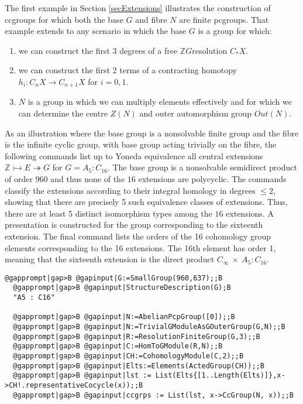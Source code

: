 \documentclass[a4paper,11pt]{report}
\begin{document}
{{The first example in Section \ref{secExtensions} illustrates the construction of cc\texttt{}groups for which both
the base $G$ and fibre $N$ are finite pc\texttt{}groups. That example extends to any scenario
in which the base $G$ is a group for which: 
\begin{enumerate}
\item we can construct the first 3 degrees of a free $\mathbb ZG$\texttt{}resolution $C_\ast X$.
\item we can construct the first 2 terms of a contracting homotopy $h_i\colon C_nX\rightarrow C_{n+1}X $ for $i=0,1$. 
\item $N$ is a group in which we can multiply elements effectively and for which we can
determine the centre $Z(N)$ and outer automorphism group $Out(N)$. 
\end{enumerate}
 

 As an illustration where the base group is a non\texttt{}solvable
finite group and the fibre is the infinite cyclic group, with base group
acting trivially on the fibre, the following commands list up to Yoneda
equivalence all central extensions $\mathbb Z \rightarrowtail E \twoheadrightarrow G$ for $G=A_5:C_{16}$. The base group is a non\texttt{}solvable
semi\texttt{}direct product of order $960$ and thus none of the $16$ extensions are polycyclic. The commands classify the extensions according to
their integral homology in degrees $ \le 2$, showing that there are precisely 5 such equivalence classes of extensions.
Thus, there are at least 5 distinct isomorphism types among the $16$ extensions. A presentation is constructed for the group corresponding to the
sixteenth extension. The final command lists the orders of the 16 cohomology
group elements corresponding to the 16 extensions. The 16th element has order
1, meaning that the sixteenth extension is the direct product $C_\infty\ \times\ A_5:C_{16}$. 
\begin{Verbatim}[commandchars=@|B,fontsize=\small,frame=single,label=Example]
  @gapprompt|gap>B @gapinput|G:=SmallGroup(960,637);;B
  @gapprompt|gap>B @gapinput|StructureDescription(G);B
  "A5 : C16"
  
  @gapprompt|gap>B @gapinput|N:=AbelianPcpGroup([0]);;B
  @gapprompt|gap>B @gapinput|N:=TrivialGModuleAsGOuterGroup(G,N);;B
  @gapprompt|gap>B @gapinput|R:=ResolutionFiniteGroup(G,3);;B
  @gapprompt|gap>B @gapinput|C:=HomToGModule(R,N);;B
  @gapprompt|gap>B @gapinput|CH:=CohomologyModule(C,2);;B
  @gapprompt|gap>B @gapinput|Elts:=Elements(ActedGroup(CH));;B
  @gapprompt|gap>B @gapinput|lst := List(Elts{[1..Length(Elts)]},x->CH!.representativeCocycle(x));;B
  @gapprompt|gap>B @gapinput|ccgrps := List(lst, x->CcGroup(N, x));;B
  

\end{Verbatim}}}
\end{document}
